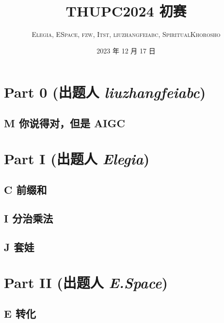 \documentclass[dvipsnames]{ctexbeamer}
\title{THUPC2024 初赛}
\author{\textsc{Elegia}, \textsc{E\textperiodcentered Space}, \textsc{fzw}, \textsc{Itst}, \textsc{liuzhangfeiabc}, \textsc{SpiritualKhorosho}\textsuperscript{\textdagger}}
\institute{清华大学算法协会}
\date{2023 年 12 月 17 日}
\begin{document}
\frame{\titlepage}


\frame[allowframebreaks]{
    \tableofcontents[sections={1-3}]
    \framebreak
    \tableofcontents[sections={4-6}]
}

\section{Part 0 (出题人 {\itshape liuzhangfeiabc})}

\subsection{M 你说得对，但是 AIGC}


\section{Part I (出题人 {\itshape Elegia})}

\subsection{C 前缀和}


\subsection{I 分治乘法}


\subsection{J 套娃}


\section{Part II (出题人 {\itshape E.Space})}

\subsection{E 转化}

\end{document}
